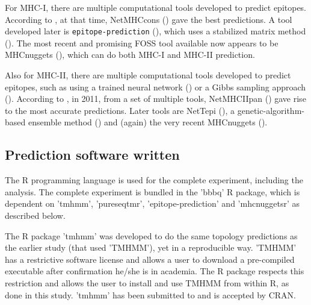 
For MHC-I, there are multiple computational tools developed 
to predict epitopes. 
According to \cite{lundegaard2011prediction}, at that time,
NetMHCcons (\cite{karosiene2012netmhccons}) gave the best predictions.
A tool developed later is \verb;epitope-prediction; (\cite{bianchi2017}),
which uses a stabilized matrix method (\cite{kim2009derivation}).
The most recent and promising FOSS tool available now appears
to be MHCnuggets (\cite{shao2020high}), which can do both MHC-I 
and MHC-II prediction.


Also for MHC-II, there are multiple computational tools developed 
to predict epitopes,
such as using a trained neural network (\cite{nielsen2003reliable})
or a Gibbs sampling approach (\cite{nielsen2004improved}).
According to \cite{lundegaard2011prediction}, in 2011,
from a set of multiple tools, 
NetMHCIIpan (\cite{nielsen2008quantitative,karosiene2013netmhciipan})
gave rise to the most accurate predictions.
Later tools are NetTepi (\cite{trolle2014nettepi}),
a genetic-algorithm-based ensemble method (\cite{zhang2015accurate})
and (again) the very recent MHCnuggets (\cite{shao2020high}).

\subsection{Prediction software written}

The R programming language is used for the complete 
experiment, including the analysis.
The complete experiment is bundled in the 'bbbq' R package,
which is dependent on 'tmhmm', 'pureseqtmr', 
'epitope-prediction' and 'mhcnuggetsr'
as described below.


The R package 'tmhmm' was developed to do the same topology
predictions as the earlier study (that used 'TMHMM'), yet in a reproducible way.
'TMHMM' has a restrictive software license and allows a user
to download a pre-compiled executable after confirmation he/she
is in academia. The R package respects this restriction
and allows the user to install and use TMHMM from within R,
as done in this study.
'tmhmm' has been submitted to and is accepted by CRAN.

